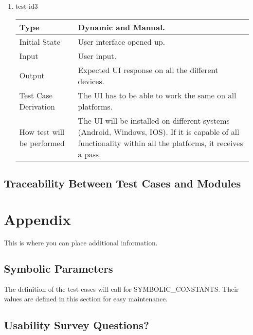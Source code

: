 \documentclass[12pt, titlepage]{article}
\begin{document}
\begin{enumerate}
\item{test-id3\\}

\begin{tabular}{ |p{5cm}||p{7cm}| }
    \hline
    Type & Dynamic and Manual. \\
    \hline
    Initial State  &  User interface opened up. \\
    \hline
    Input &   User input. \\
    \hline
    Output &   Expected UI response on all the different devices.  \\
    \hline
    Test Case Derivation &   The UI has to be able to work the same on all platforms. \\
    \hline
    How test will be performed & The UI will be installed on different systems (Android, Windows, IOS). If it is capable of all functionality within all the platforms, it receives a pass. \\
    \hline
\end{tabular}

\end{enumerate}


\subsection{Traceability Between Test Cases and Modules}

				




\newpage

\section{Appendix}

This is where you can place additional information.

\subsection{Symbolic Parameters}

The definition of the test cases will call for SYMBOLIC\_CONSTANTS.
Their values are defined in this section for easy maintenance.

\subsection{Usability Survey Questions?}
\end{document}
